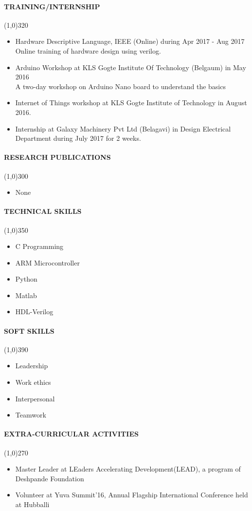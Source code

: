 \documentclass[12pt,a4paper]{article}
\begin{document}
\paragraph{TRAINING/INTERNSHIP}
	\line(1,0){320}
	\begin{itemize}
		\item Hardware Descriptive Language,  IEEE (Online) during Apr 2017 - Aug 2017\\
Online training of hardware design using verilog.
	\item Arduino Workshop at KLS Gogte Institute Of Technology (Belgaum) in May 2016\\
A two-day workshop on Arduino Nano board to understand the basics
	\item Internet of Things workshop at KLS Gogte Institute of Technology in August 2016.
	\item Internship at Galaxy Machinery Pvt Ltd (Belagavi) in Design Electrical Department during July 2017 for 2 weeks.
	\end{itemize}
\paragraph{RESEARCH PUBLICATIONS}
	\line(1,0){300}
	\begin{itemize}
		\item None
	\end{itemize}

\paragraph{TECHNICAL SKILLS}
	\line(1,0){350}
	\begin{itemize}
		\item C Programming
		\item ARM Microcontroller
		\item Python
		\item Matlab
		\item HDL-Verilog
	\end{itemize}
\paragraph{SOFT SKILLS}
	\line(1,0){390}
	\begin{itemize}
		\item Leadership
		\item Work ethics
		\item Interpersonal
		\item Teamwork
	\end{itemize}
\paragraph{EXTRA-CURRICULAR ACTIVITIES}
	\line(1,0){270}
	\begin{itemize}
		\item Master Leader at LEaders Accelerating Development(LEAD), a program of Deshpande Foundation
		\item Volunteer at Yuva Summit'16, Annual Flagship International Conference held at Hubballi
	\end{itemize}
\end{document}

